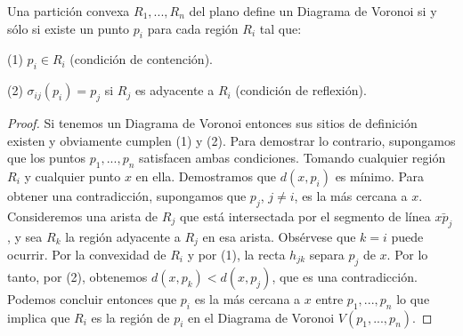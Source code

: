 \begin{lema}\label{lema44}
    Una partición convexa $R_{1},...,R_{n}$ del plano define un Diagrama de Voronoi si y sólo si existe un punto $p_{i}$ para cada región $R_{i}$ tal que:
    \item [(1)] $p_{i} \in R_{i}$ (condición de contención).
    \item [(2)] $\sigma_{ij}(p_{i})=p_{j}$ si $R_{j}$ es adyacente a $R_{i}$ (condición de reflexión).
\end{lema}
\begin{proof}
    Si tenemos un Diagrama de Voronoi entonces sus sitios de definición existen y obviamente cumplen (1) y (2). Para demostrar lo contrario, supongamos que los puntos $p_{1},...,p_{n}$ satisfacen ambas condiciones. Tomando cualquier región $R_{i}$ y cualquier punto $x$ en ella. Demostramos que $d(x,p_{i})$ es mínimo.
    Para obtener una contradicción, supongamos que $p_{j}$, $j \not= i$, es la más cercana a $x$. Consideremos una arista de $R_{j}$ que está intersectada por el segmento de línea $\bar{xp_{j}}$, y sea $R_{k}$ la región adyacente a $R_{j}$ en esa arista. Obsérvese que $k=i$ puede ocurrir. Por la convexidad de $R_{i}$ y por (1), la recta $h_{jk}$ separa $p_{j}$ de $x$. Por lo tanto, por (2), obtenemos $d(x,p_{k})<d(x,p_{j})$, que es una contradicción.
    Podemos concluir entonces que $p_{i}$ es la más cercana a $x$ entre $p_{1},...,p_{n}$ lo que implica que $R_{i}$ es la región de $p_{i}$ en el Diagrama de Voronoi $V({p_{1},...,p_{n}})$.
\end{proof}

